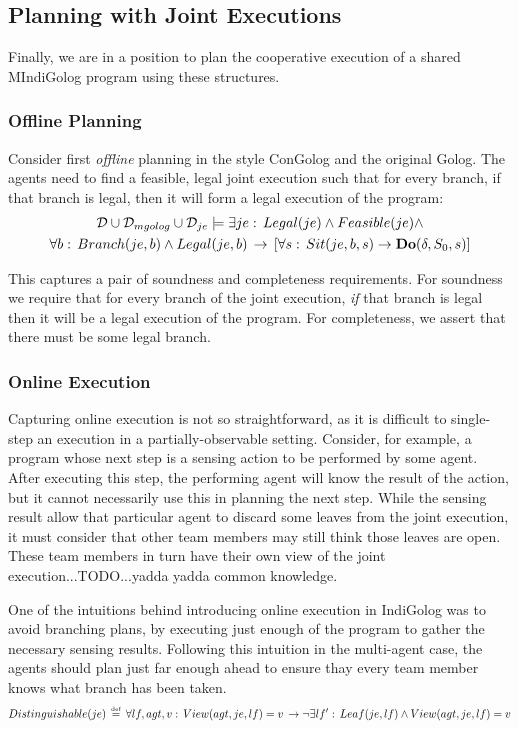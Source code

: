 \subsection{Planning with Joint Executions}

Finally, we are in a position to plan the cooperative execution of
a shared MIndiGolog program using these structures.


\subsubsection{Offline Planning}

Consider first \emph{offline} planning in the style ConGolog and the
original Golog. The agents need to find a feasible, legal joint execution
such that for every branch, if that branch is legal, then it will
form a legal execution of the program:\begin{multline*}
\mathcal{D}\cup\mathcal{D}_{mgolog}\cup\mathcal{D}_{je}\models\exists je:\, Legal(je)\wedge Feasible(je)\wedge\\
\forall b:\, Branch(je,b)\wedge Legal(je,b)\,\rightarrow\,\left[\forall s:\, Sit(je,b,s)\rightarrow\mathbf{Do}(\delta,S_{0},s)\right]\end{multline*}


This captures a pair of soundness and completeness requirements. For
soundness we require that for every branch of the joint execution,
\emph{if} that branch is legal then it will be a legal execution of
the program. For completeness, we assert that there must be some legal
branch.


\subsubsection{Online Execution}

Capturing online execution is not so straightforward, as it is difficult
to single-step an execution in a partially-observable setting. Consider,
for example, a program whose next step is a sensing action to be performed
by some agent. After executing this step, the performing agent will
know the result of the action, but it cannot necessarily use this
in planning the next step. While the sensing result allow that particular
agent to discard some leaves from the joint execution, it must consider
that other team members may still think those leaves are open. These
team members in turn have their own view of the joint execution...TODO...yadda
yadda common knowledge.

One of the intuitions behind introducing online execution in IndiGolog
was to avoid branching plans, by executing just enough of the program
to gather the necessary sensing results. Following this intuition
in the multi-agent case, the agents should plan just far enough ahead
to ensure thay every team member knows what branch has been taken.\[
Distinguishable(je)\,\stackrel{\mbox{\tiny def}}{=}\,\forall lf,agt,v:\, View(agt,je,lf)=v\,\rightarrow\neg\exists lf':\, Leaf(je,lf)\wedge View(agt,je,lf)=v\]


